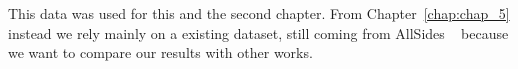 

This data was used for this and the second chapter. From Chapter~\ref{chap:chap_5} instead we rely mainly on a existing dataset, still coming from AllSides ~\citep{baly-dataset} because we want to compare our results with other works.



